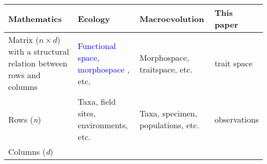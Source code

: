 \documentclass[]{article}
\begin{document}
\begin{longtable}[]{@{}llll@{}}
\toprule
\begin{minipage}[b]{0.24\columnwidth}\raggedright\strut
Mathematics\strut
\end{minipage} & \begin{minipage}[b]{0.24\columnwidth}\raggedright\strut
Ecology\strut
\end{minipage} & \begin{minipage}[b]{0.24\columnwidth}\raggedright\strut
Macroevolution\strut
\end{minipage} & \begin{minipage}[b]{0.15\columnwidth}\raggedright\strut
This paper\strut
\end{minipage}\tabularnewline
\midrule
\endhead
\begin{minipage}[t]{0.24\columnwidth}\raggedright\strut
Matrix (\(n \times d\)) with a structural relation between rows and
columns\strut
\end{minipage} & \begin{minipage}[t]{0.24\columnwidth}\raggedright\strut
\textcolor{blue}{ Functional space, morphospace },
etc.\strut
\end{minipage} & \begin{minipage}[t]{0.24\columnwidth}\raggedright\strut
Morphospace, traitspace, etc.\strut
\end{minipage} & \begin{minipage}[t]{0.15\columnwidth}\raggedright\strut
trait space\strut
\end{minipage}\tabularnewline
\begin{minipage}[t]{0.24\columnwidth}\raggedright\strut
Rows (\emph{n})\strut
\end{minipage} & \begin{minipage}[t]{0.24\columnwidth}\raggedright\strut
Taxa, field sites, environments, etc.\strut
\end{minipage} & \begin{minipage}[t]{0.24\columnwidth}\raggedright\strut
Taxa, specimen, populations, etc.\strut
\end{minipage} & \begin{minipage}[t]{0.15\columnwidth}\raggedright\strut
observations\strut
\end{minipage}\tabularnewline
\begin{minipage}[t]{0.24\columnwidth}\raggedright\strut
Columns (\emph{d})\strut
\end{minipage} & \begin{minipage}[t]{0.24\columnwidth}\raggedright\strut

\end{minipage}
\end{longtable}
\end{document}
